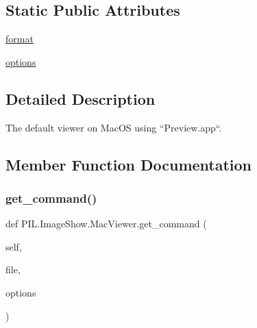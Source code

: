 \subsection*{Static Public Attributes}
\begin{DoxyCompactItemize}
\item 
\hyperlink{classPIL_1_1ImageShow_1_1MacViewer_a6302eb1255d9e0db266fd3b5d121039c}{format}
\item 
\hyperlink{classPIL_1_1ImageShow_1_1MacViewer_ab5bc10ef38304f9a19b548923a76485c}{options}
\end{DoxyCompactItemize}


\subsection{Detailed Description}
\begin{DoxyVerb}The default viewer on MacOS using ``Preview.app``.\end{DoxyVerb}
 

\subsection{Member Function Documentation}
\mbox{\label{classPIL_1_1ImageShow_1_1MacViewer_a58f2bb39c85dbd21198de8963d8de0d1}} 
\subsubsection{\texorpdfstring{get\+\_\+command()}{get\_command()}}
{\footnotesize\ttfamily def P\+I\+L.\+Image\+Show.\+Mac\+Viewer.\+get\+\_\+command (\begin{DoxyParamCaption}\item[{}]{self,  }\item[{}]{file,  }\item[{}]{options }\end{DoxyParamCaption})}

\mbox{\label{classPIL_1_1ImageShow_1_1MacViewer_afd74dc5d4a32b4743de66709af04ccdd}} 
